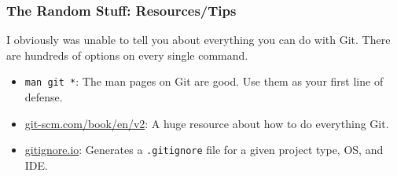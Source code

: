 \documentclass{beeper}
\begin{document}
\begin{frame}
    \frametitle{The Random Stuff: Resources/Tips}

    I obviously was unable to tell you about everything you can do with Git.
    There are hundreds of options on every single command.

    \begin{itemize}
        \item \texttt{man git *}: The man pages on Git are good. Use them as your first line of
            defense.
        \item \href{https://git-scm.com/book/en/v2}{git-scm.com/book/en/v2}: A
            huge resource about how to do everything Git.
        \item \href{https://gitignore.io}{gitignore.io}: Generates a
            \texttt{.gitignore} file for a given project type, OS, and IDE.
    \end{itemize}
\end{frame}
\end{document}
